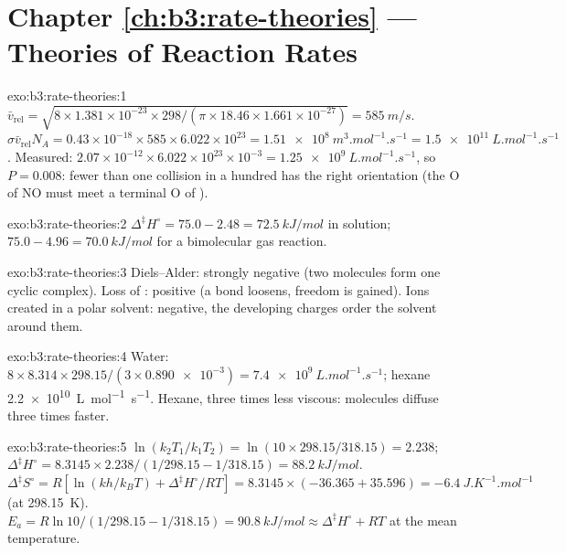 \section*{Chapter \ref{ch:b3:rate-theories} --- Theories of Reaction Rates}

\begin{solution}{exo:b3:rate-theories:1}
$\bar v_{\mathrm{rel}} = \sqrt{8 \times 1.381\times10^{-23} \times 298/(\pi \times 18.46 \times 1.661\times10^{-27})} = \qty{585}{m/s}$.
$\sigma\bar v_{\mathrm{rel}}N_A = 0.43\times10^{-18} \times 585 \times 6.022\times10^{23} = \qty{1.51e8}{m^3.mol^{-1}.s^{-1}} =
\qty{1.5e11}{L.mol^{-1}.s^{-1}}$. Measured: $2.07\times10^{-12} \times 6.022\times10^{23}\times10^{-3} =
\qty{1.25e9}{L.mol^{-1}.s^{-1}}$, so $P = 0.008$: fewer than one collision in a hundred has the
right orientation (the O of NO must meet a terminal O of ).
\end{solution}

\begin{solution}{exo:b3:rate-theories:2}
$\Delta^{\ddagger}H^\circ = 75.0 - 2.48 = \qty{72.5}{kJ/mol}$ in solution; $75.0 - 4.96 = \qty{70.0}{kJ/mol}$
for a bimolecular gas reaction.
\end{solution}

\begin{solution}{exo:b3:rate-theories:3}
Diels--Alder: strongly negative (two molecules form one cyclic complex).
Loss of : positive (a bond loosens, freedom is gained). Ions created in a
polar solvent: negative, the developing charges order the solvent around them.
\end{solution}

\begin{solution}{exo:b3:rate-theories:4}
Water: $8 \times 8.314 \times 298.15/(3 \times \num{0.890e-3}) = \qty{7.4e9}{L.mol^{-1}.s^{-1}}$; hexane
\qty{2.2e10}{L.mol^{-1}.s^{-1}}. Hexane, three times less viscous: molecules diffuse three
times faster.
\end{solution}

\begin{solution}{exo:b3:rate-theories:5}
$\ln(k_2T_1/k_1T_2) = \ln(10 \times 298.15/318.15) = 2.238$; $\Delta^{\ddagger}H^\circ = 8.3145 \times 2.238/(1/298.15 -
1/318.15) = \qty{88.2}{kJ/mol}$. $\Delta^{\ddagger}S^\circ = R[\ln(kh/k_BT) + \Delta^{\ddagger}H^\circ/RT] = 8.3145 \times
(-36.365 + 35.596) = \qty{-6.4}{J.K^{-1}.mol^{-1}}$ (at \qty{298.15}{K}). $E_a = R\ln10/(1/298.15 - 1/318.15) =
\qty{90.8}{kJ/mol} \approx \Delta^{\ddagger}H^\circ + RT$ at the mean temperature.
\end{solution}

